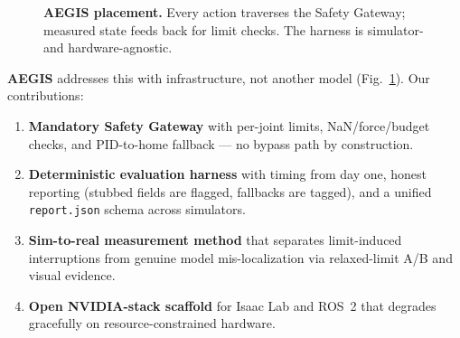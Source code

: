 \documentclass[11pt,a4paper,twocolumn]{article}
\begin{document}
\begin{figure}[htbp]
\centering
{}
\caption{\textbf{AEGIS placement.} Every action traverses the Safety Gateway; measured state feeds back for limit checks. The harness is simulator- and hardware-agnostic.}
\label{fig:placement}
\end{figure}

\textbf{AEGIS} addresses this with infrastructure, not another model (Fig.~\ref{fig:placement}). Our contributions:

\begin{enumerate}[leftmargin=14pt]
\item \textbf{Mandatory Safety Gateway} with per-joint limits, NaN/force/budget checks, and PID-to-home fallback --- no bypass path by construction.
\item \textbf{Deterministic evaluation harness} with timing from day one, honest reporting (stubbed fields are flagged, fallbacks are tagged), and a unified \texttt{report.json} schema across simulators.
\item \textbf{Sim-to-real measurement method} that separates limit-induced interruptions from genuine model mis-localization via relaxed-limit A/B and visual evidence.
\item \textbf{Open NVIDIA-stack scaffold} for Isaac Lab and ROS~2 that degrades gracefully on resource-constrained hardware.
\end{enumerate}
\end{document}
